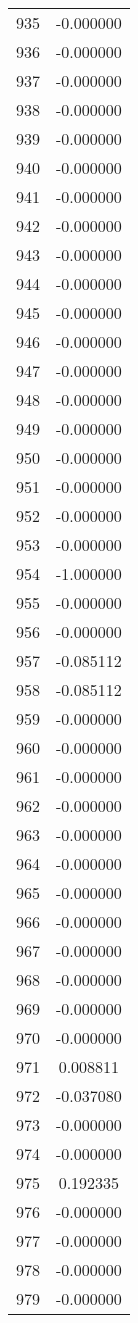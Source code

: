 \documentclass[12pt]{article}
\begin{document}
\begin{longtable}{@{}cc@{}}
935 & -0.000000 \\
936 & -0.000000 \\
937 & -0.000000 \\
938 & -0.000000 \\
939 & -0.000000 \\
940 & -0.000000 \\
941 & -0.000000 \\
942 & -0.000000 \\
943 & -0.000000 \\
944 & -0.000000 \\
945 & -0.000000 \\
946 & -0.000000 \\
947 & -0.000000 \\
948 & -0.000000 \\
949 & -0.000000 \\
950 & -0.000000 \\
951 & -0.000000 \\
952 & -0.000000 \\
953 & -0.000000 \\
954 & -1.000000 \\
955 & -0.000000 \\
956 & -0.000000 \\
957 & -0.085112 \\
958 & -0.085112 \\
959 & -0.000000 \\
960 & -0.000000 \\
961 & -0.000000 \\
962 & -0.000000 \\
963 & -0.000000 \\
964 & -0.000000 \\
965 & -0.000000 \\
966 & -0.000000 \\
967 & -0.000000 \\
968 & -0.000000 \\
969 & -0.000000 \\
970 & -0.000000 \\
971 & 0.008811 \\
972 & -0.037080 \\
973 & -0.000000 \\
974 & -0.000000 \\
975 & 0.192335 \\
976 & -0.000000 \\
977 & -0.000000 \\
978 & -0.000000 \\
979 & -0.000000 \\

\end{longtable}
\end{document}
